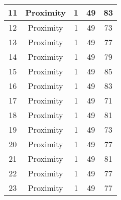 \documentclass[results.tex]{subfiles}
\begin{document}
\begin{center}
\begin{tabular}{| c || c | c | c | c |}
            \hline
            11                      & Proximity                    & 1                      & 49                      & 83                   \\
            \hline
            12                      & Proximity                    & 1                      & 49                      & 73                   \\
            \hline
            13                      & Proximity                    & 1                      & 49                      & 77                   \\
            \hline
            14                      & Proximity                    & 1                      & 49                      & 79                   \\
            \hline
            15                      & Proximity                    & 1                      & 49                      & 85                   \\
            \hline
            16                      & Proximity                    & 1                      & 49                      & 83                   \\
            \hline
            17                      & Proximity                    & 1                      & 49                      & 71                   \\
            \hline
            18                      & Proximity                    & 1                      & 49                      & 81                   \\
            \hline
            19                      & Proximity                    & 1                      & 49                      & 73                   \\
            \hline
            20                      & Proximity                    & 1                      & 49                      & 77                   \\
            \hline
            21                      & Proximity                    & 1                      & 49                      & 81                   \\
            \hline
            22                      & Proximity                    & 1                      & 49                      & 77                   \\
            \hline
            23                      & Proximity                    & 1                      & 49                      & 77                   \\

\end{tabular}
\end{center}
\end{document}

